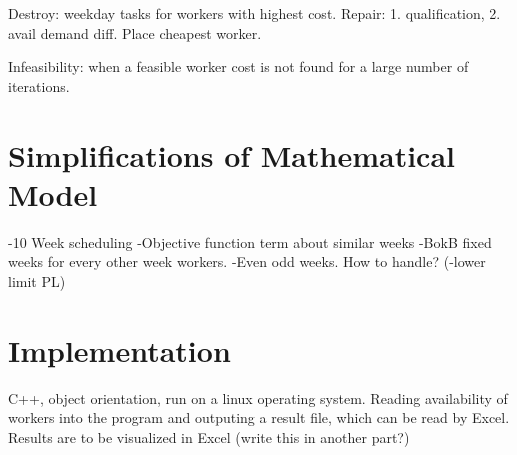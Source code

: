 Destroy: weekday tasks for workers with highest cost.
Repair: 1. qualification, 2. avail demand diff. Place cheapest worker.

Infeasibility: when a feasible worker cost is not found for a large number of iterations. 

\section{Simplifications of Mathematical Model}
-10 Week scheduling
-Objective function term about similar weeks
-BokB fixed weeks for every other week workers.
-Even odd weeks. How to handle?
(-lower limit PL)

\section{Implementation}
C++, object orientation, run on a linux operating system. Reading availability of workers into the program and outputing a result file, which can be read by Excel. Results are to be visualized in Excel (write this in another part?)
